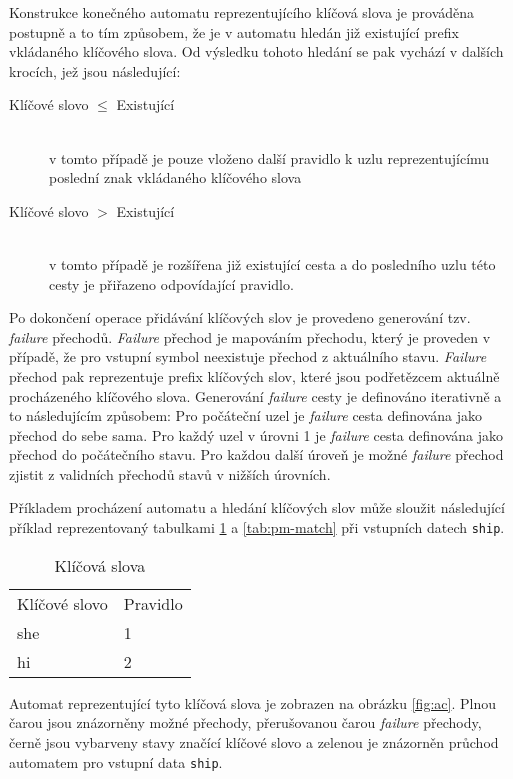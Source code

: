 Konstrukce konečného automatu reprezentujícího klíčová slova je prováděna postupně a to tím způsobem,
že je v automatu hledán již existující prefix vkládaného klíčového slova. Od výsledku tohoto hledání
se pak vychází v dalších krocích, jež jsou následující:

\begin{description}
    \item[Klíčové slovo $\leq$ Existující] ~\\
    v tomto případě je pouze vloženo další pravidlo k uzlu reprezentujícímu poslední znak vkládaného
    klíčového slova
    \item[Klíčové slovo $>$ Existující] ~\\
    v tomto případě je rozšířena již existující cesta a do posledního
    uzlu této cesty je přiřazeno odpovídající pravidlo.
\end{description}

Po dokončení operace přidávání klíčových slov je provedeno generování tzv. \textit{failure} přechodů.
\textit{Failure} přechod je mapováním přechodu, který je proveden v případě, že pro vstupní symbol neexistuje
přechod z aktuálního stavu. \textit{Failure} přechod pak reprezentuje prefix klíčových slov,
které jsou podřetězcem aktuálně procházeného klíčového slova.
Generování \textit{failure} cesty je definováno iterativně a to následujícím způsobem:
Pro počáteční uzel je \textit{failure} cesta definována jako přechod do sebe sama.
Pro každý uzel v úrovni 1 je \textit{failure} cesta definována jako přechod do počátečního stavu.
Pro každou další úroveň je možné \textit{failure} přechod zjistit z validních přechodů stavů v nižších úrovních.

Příkladem procházení automatu a hledání klíčových slov může sloužit následující příklad reprezentovaný tabulkami
\ref{tab:pm-keywords} a \ref{tab:pm-match} při vstupních datech \texttt{ship}.

\begin{table}[!htbp]
    \center
    \begin{tabular}{|l|l|}
    \hline
    Klíčové slovo & Pravidlo \\ \hhline{|=|=|}
    she & 1  \\ \hline
    hi & 2 \\ \hline
    \end{tabular}
    \caption{Klíčová slova}
    \label{tab:pm-keywords}
\end{table}

Automat reprezentující tyto klíčová slova je zobrazen na obrázku \ref{fig:ac}.
Plnou čarou jsou znázorněny možné přechody, přerušovanou čarou \textit{failure} přechody,
černě jsou vybarveny stavy značící klíčové slovo
a zelenou
je znázorněn průchod automatem pro vstupní data \texttt{ship}.

